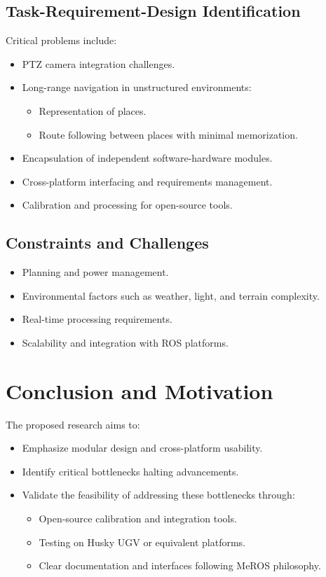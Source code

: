 \documentclass[runningheads]{llncs}
\begin{document}
\subsection{Task-Requirement-Design Identification}
Critical problems include:
\begin{itemize}
    \item PTZ camera integration challenges.
    \item Long-range navigation in unstructured environments:
        \begin{itemize}
            \item Representation of places.
            \item Route following between places with minimal memorization.
        \end{itemize}
    \item Encapsulation of independent software-hardware modules.
    \item Cross-platform interfacing and requirements management.
    \item Calibration and processing for open-source tools.
\end{itemize}

\subsection{Constraints and Challenges}
\begin{itemize}
    \item Planning and power management.
    \item Environmental factors such as weather, light, and terrain complexity.
    \item Real-time processing requirements.
    \item Scalability and integration with ROS platforms.
\end{itemize}

\section{Conclusion and Motivation}
The proposed research aims to:
\begin{itemize}
    \item Emphasize modular design and cross-platform usability.
    \item Identify critical bottlenecks halting advancements.
    \item Validate the feasibility of addressing these bottlenecks through:
        \begin{itemize}
            \item Open-source calibration and integration tools.
            \item Testing on Husky UGV or equivalent platforms.
            \item Clear documentation and interfaces following MeROS philosophy.
        \end{itemize}
\end{itemize}
\end{document}

